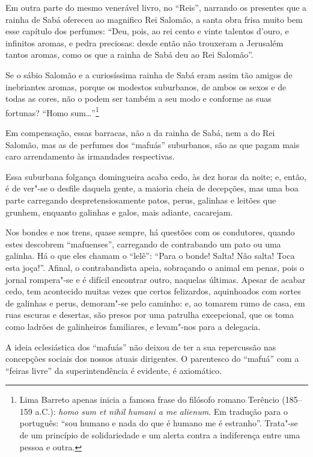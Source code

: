 Em outra parte do mesmo venerável livro, no ``Reis'', narrando os
presentes que a rainha de Sabá ofereceu ao magnifico Rei Salomão, a
santa obra frisa muito bem esse capítulo dos perfumes: ``Deu, pois, ao
rei cento e vinte talentos d'ouro, e infinitos aromas, e pedra
preciosas: desde então não trouxeram a Jerusalém tantos aromas, como os
que a rainha de Sabá deu ao Rei Salomão''.

Se o sábio Salomão e a curiosíssima rainha de Sabá eram assim tão amigos
de inebriantes aromas, porque os modestos suburbanos, de ambos os sexos
e de todas as cores, não o podem ser também a seu modo e conforme as
suas fortunas? ``Homo sum\ldots{}''\footnote{Lima Barreto apenas inicia a
  famosa frase do filósofo romano Terêncio (185--159 a.C.):
  \emph{homo sum et nihil humani a me alienum}. Em tradução para o
  português: ``sou humano e nada do que é humano me é estranho''.
  Trata"-se de um princípio de solidariedade e um alerta contra a
  indiferença entre uma pessoa e outra.}

Em compensação, essas barracas, não a da rainha de Sabá, nem a do Rei
Salomão, mas as de perfumes dos ``mafuás'' suburbanos, são as que pagam
mais caro arrendamento às irmandades respectivas.

Essa suburbana folgança domingueira acaba cedo, às dez horas da noite;
e, então, é de ver"-se o desfile daquela gente, a maioria cheia de
decepções, mas uma boa parte carregando despretensiosamente patos,
perus, galinhas e leitões que grunhem, enquanto galinhas e galos, mais
adiante, cacarejam.

Nos bondes e nos trens, quase sempre, há questões com os condutores,
quando estes descobrem ``mafuenses'', carregando de contrabando um pato
ou uma galinha. Há o que eles chamam o ``lelê'': ``Para o bonde! Salta!
Não salta! Toca esta joça!''. Afinal, o contrabandista apeia, sobraçando
o animal em penas, pois o jornal rompera"-se e é difícil encontrar outro,
naquelas últimas. Apesar de acabar cedo, tem acontecido muitas vezes que
certos felizardos, aquinhoados com sortes de galinhas e perus,
demoram"-se pelo caminho: e, ao tomarem rumo de casa, em ruas escuras e
desertas, são presos por uma patrulha excepcional, que os toma como
ladrões de galinheiros familiares, e levam"-nos para a delegacia.

A ideia eclesiástica dos ``mafuás'' não deixou de ter a sua repercussão
nas concepções sociais dos nossos atuais dirigentes. O parentesco do
``mafuá'' com a ``feiras livre'' da superintendência é evidente, é
axiomático.

